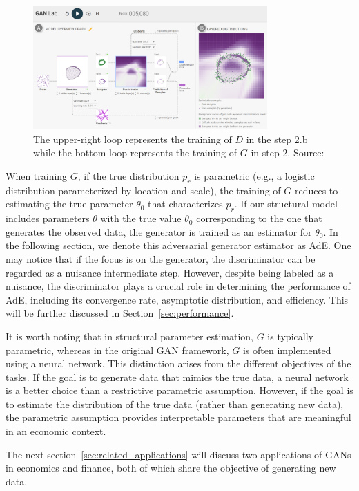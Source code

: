 \documentclass[12pt]{article}
\begin{document}
\begin{figure}[!htbp]
    \centering
    \includegraphics[width=0.8\textwidth]{../Figures/Algorithm.png}
    \caption{The upper-right loop represents the training of $D$ in the step 2.b while the bottom loop represents the training of $G$ in step 2. Source: \citet{kahng2018gan}}
    \label{fig:algorithm}
\end{figure}

When training \(G\), if the true distribution \(p_r\) is parametric (e.g., a
logistic distribution parameterized by location and scale), the training of
\(G\) reduces to estimating the true parameter \(\theta_0\) that characterizes
\(p_r\). If our structural model includes parameters \(\theta\) with the true
value \(\theta_0\) corresponding to the one that generates the observed data,
the generator is trained as an estimator for \(\theta_0\). In the following
section, we denote this adversarial generator estimator as AdE. One may notice
that if the focus is on the generator, the discriminator can be regarded as a
nuisance intermediate step. However, despite being labeled as a nuisance, the
discriminator plays a crucial role in determining the performance of AdE,
including its convergence rate, asymptotic distribution, and efficiency. This
will be further discussed in Section~\ref{sec:performance}.

It is worth noting that in structural parameter estimation, \(G\) is typically
parametric, whereas in the original GAN framework, \(G\) is often implemented
using a neural network. This distinction arises from the different objectives
of the tasks. If the goal is to generate data that mimics the true data, a
neural network is a better choice than a restrictive parametric assumption.
However, if the goal is to estimate the distribution of the true data (rather
than generating new data), the parametric assumption provides interpretable
parameters that are meaningful in an economic context.

The next section~\ref{sec:related_applications} will discuss two applications
of GANs in economics and finance, both of which share the objective of
generating new data.
\end{document}
